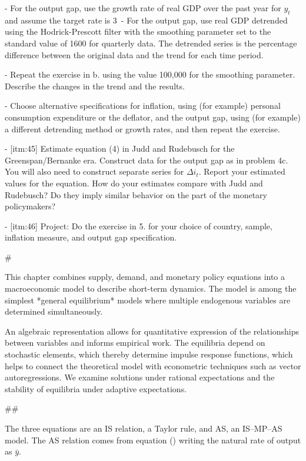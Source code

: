 ﻿\documentclass[oneside]{book}
\begin{document}
- For the output gap, use the growth rate of real GDP over the past year
for $y_{t}$ and assume the target rate is 3\
- For the output gap, use real GDP detrended using the Hodrick-Prescott
filter with the smoothing parameter set to the standard value of 1600 for
quarterly data. The detrended series is the percentage difference between the
original data and the trend for each time period.

- Repeat the exercise in b. using the value 100,000 for the smoothing
parameter. Describe the changes in the trend and the results.

- Choose alternative specifications for inflation, using (for example) personal consumption expenditure or the deflator, and the output gap, using (for example) a different detrending method or growth rates, and then
repeat the exercise.

- [itm:45] Estimate equation (4) in Judd and Rudebusch  for the Greenspan/Bernanke era. Construct data for the output gap as in problem 4c. You will also need to construct separate series for $\Delta i_{t}$. Report your estimated values for the equation. How do your estimates compare with Judd and Rudebusch? Do they imply similar behavior on the part of the monetary policymakers?

- [itm:46] Project: Do the exercise in 5. for your choice of country, sample, inflation measure, and output gap specification.



#



This chapter combines supply, demand, and monetary policy equations into a
macroeconomic model to describe short-term dynamics. The model is among the simplest *general equilibrium* models where multiple endogenous variables are determined simultaneously.

An algebraic representation allows for quantitative expression of the relationships between variables and informs empirical work. The equilibria depend on stochastic elements, which thereby determine impulse response
functions, which helps to connect the theoretical model with econometric
techniques such as vector autoregressions. We examine solutions under rational expectations and the stability of equilibria under adaptive expectations.



##



The three equations are an IS relation, a Taylor rule, and AS,
an IS--MP--AS model. The AS relation
comes from equation () writing the natural rate of output as $\bar{y}$.
\end{document}
